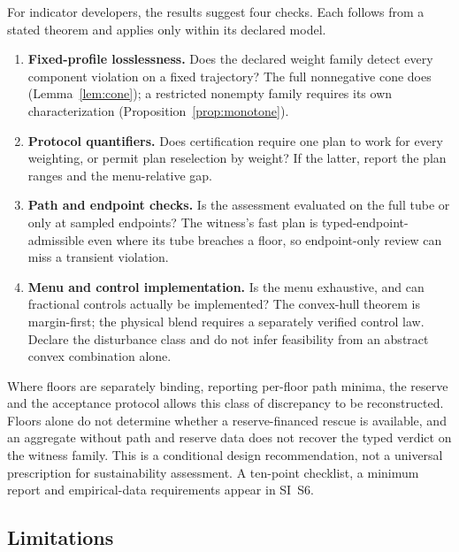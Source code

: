For indicator developers, the results suggest four checks. Each follows from a stated theorem and applies only within its declared model.
\begin{enumerate}[leftmargin=2em]
\item \textbf{Fixed-profile losslessness.} Does the declared weight family detect every component violation on a fixed trajectory? The full nonnegative cone does (Lemma~\ref{lem:cone}); a restricted nonempty family requires its own characterization (Proposition~\ref{prop:monotone}).
\item \textbf{Protocol quantifiers.} Does certification require one plan to work for every weighting, or permit plan reselection by weight? If the latter, report the plan ranges and the menu-relative gap.
\item \textbf{Path and endpoint checks.} Is the assessment evaluated on the full tube or only at sampled endpoints? The witness's fast plan is typed-endpoint-admissible even where its tube breaches a floor, so endpoint-only review can miss a transient violation.
\item \textbf{Menu and control implementation.} Is the menu exhaustive, and can fractional controls actually be implemented? The convex-hull theorem is margin-first; the physical blend requires a separately verified control law. Declare the disturbance class and do not infer feasibility from an abstract convex combination alone.
\end{enumerate}

Where floors are separately binding, reporting per-floor path minima, the reserve and the acceptance protocol allows this class of discrepancy to be reconstructed. Floors alone do not determine whether a reserve-financed rescue is available, and an aggregate without path and reserve data does not recover the typed verdict on the witness family. This is a conditional design recommendation, not a universal prescription for sustainability assessment. A ten-point checklist, a minimum report and empirical-data requirements appear in SI~S6.

\subsection{Limitations}\label{sec:limitations}

